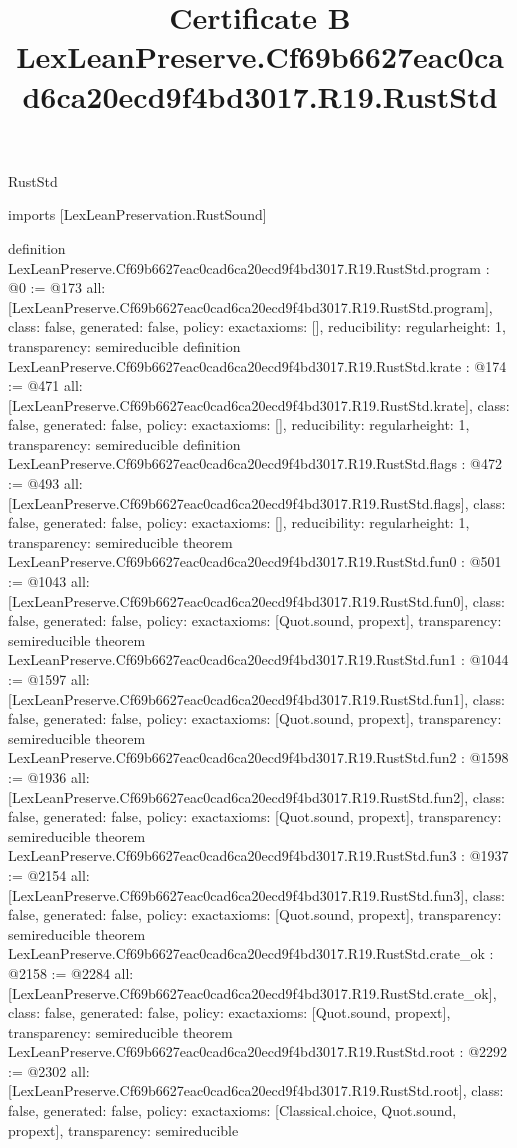 \begin{lexlean}{RustStd}
\title{Certificate B LexLeanPreserve.Cf69b6627eac0cad6ca20ecd9f4bd3017.R19.RustStd}
\begin{coremodule}
imports [LexLeanPreservation.RustSound]

definition LexLeanPreserve.Cf69b6627eac0cad6ca20ecd9f4bd3017.R19.RustStd.program : @0 := @173 {
  all: [LexLeanPreserve.Cf69b6627eac0cad6ca20ecd9f4bd3017.R19.RustStd.program],
  class: false,
  generated: false,
  policy: exact{axioms: []},
  reducibility: regular{height: 1},
  transparency: semireducible
}
definition LexLeanPreserve.Cf69b6627eac0cad6ca20ecd9f4bd3017.R19.RustStd.krate : @174 := @471 {
  all: [LexLeanPreserve.Cf69b6627eac0cad6ca20ecd9f4bd3017.R19.RustStd.krate],
  class: false,
  generated: false,
  policy: exact{axioms: []},
  reducibility: regular{height: 1},
  transparency: semireducible
}
definition LexLeanPreserve.Cf69b6627eac0cad6ca20ecd9f4bd3017.R19.RustStd.flags : @472 := @493 {
  all: [LexLeanPreserve.Cf69b6627eac0cad6ca20ecd9f4bd3017.R19.RustStd.flags],
  class: false,
  generated: false,
  policy: exact{axioms: []},
  reducibility: regular{height: 1},
  transparency: semireducible
}
theorem LexLeanPreserve.Cf69b6627eac0cad6ca20ecd9f4bd3017.R19.RustStd.fun0 : @501 := @1043 {
  all: [LexLeanPreserve.Cf69b6627eac0cad6ca20ecd9f4bd3017.R19.RustStd.fun0],
  class: false,
  generated: false,
  policy: exact{axioms: [Quot.sound, propext]},
  transparency: semireducible
}
theorem LexLeanPreserve.Cf69b6627eac0cad6ca20ecd9f4bd3017.R19.RustStd.fun1 : @1044 := @1597 {
  all: [LexLeanPreserve.Cf69b6627eac0cad6ca20ecd9f4bd3017.R19.RustStd.fun1],
  class: false,
  generated: false,
  policy: exact{axioms: [Quot.sound, propext]},
  transparency: semireducible
}
theorem LexLeanPreserve.Cf69b6627eac0cad6ca20ecd9f4bd3017.R19.RustStd.fun2 : @1598 := @1936 {
  all: [LexLeanPreserve.Cf69b6627eac0cad6ca20ecd9f4bd3017.R19.RustStd.fun2],
  class: false,
  generated: false,
  policy: exact{axioms: [Quot.sound, propext]},
  transparency: semireducible
}
theorem LexLeanPreserve.Cf69b6627eac0cad6ca20ecd9f4bd3017.R19.RustStd.fun3 : @1937 := @2154 {
  all: [LexLeanPreserve.Cf69b6627eac0cad6ca20ecd9f4bd3017.R19.RustStd.fun3],
  class: false,
  generated: false,
  policy: exact{axioms: [Quot.sound, propext]},
  transparency: semireducible
}
theorem LexLeanPreserve.Cf69b6627eac0cad6ca20ecd9f4bd3017.R19.RustStd.crate_ok : @2158 := @2284 {
  all: [LexLeanPreserve.Cf69b6627eac0cad6ca20ecd9f4bd3017.R19.RustStd.crate_ok],
  class: false,
  generated: false,
  policy: exact{axioms: [Quot.sound, propext]},
  transparency: semireducible
}
theorem LexLeanPreserve.Cf69b6627eac0cad6ca20ecd9f4bd3017.R19.RustStd.root : @2292 := @2302 {
  all: [LexLeanPreserve.Cf69b6627eac0cad6ca20ecd9f4bd3017.R19.RustStd.root],
  class: false,
  generated: false,
  policy: exact{axioms: [Classical.choice, Quot.sound, propext]},
  transparency: semireducible
}


\end{coremodule}
\end{lexlean}
